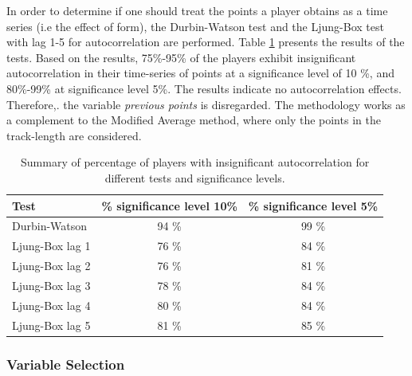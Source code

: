 In order to determine if one should treat the points a player obtains as a time series (i.e the effect of form), the Durbin-Watson test and the Ljung-Box test with lag 1-5 for autocorrelation are performed. Table \ref{tab:auto_tests} presents the results of the tests. Based on the results, 75\%-95\% of the players exhibit insignificant autocorrelation in their time-series of points at a significance level of 10 \%, and 80\%-99\% at significance level 5\%. The results indicate no autocorrelation effects. Therefore,. the variable \textit{previous points} is disregarded. The methodology works as a complement to the Modified Average method, where only the points in the track-length are considered.

\begin{table}[H]
\centering
\begin{tabular}{|l|c|c|}
\hline
Test            & \% significance level 10\% & \% significance level 5\% \\
\hline
Durbin-Watson   & 94 \% & 99 \%                                            \\
Ljung-Box lag 1 & 76 \% & 84 \%                                            \\
Ljung-Box lag 2 & 76 \% & 81 \%                                            \\
Ljung-Box lag 3 & 78 \% & 84 \%                                            \\
Ljung-Box lag 4 & 80 \% & 84 \%                                           \\
Ljung-Box lag 5 & 81 \% & 85 \%                
\\
\hline
\end{tabular}
\caption{Summary of percentage of players with insignificant autocorrelation for different tests and significance levels.}
\label{tab:auto_tests}
\end{table}

\subsubsection{Variable Selection}

